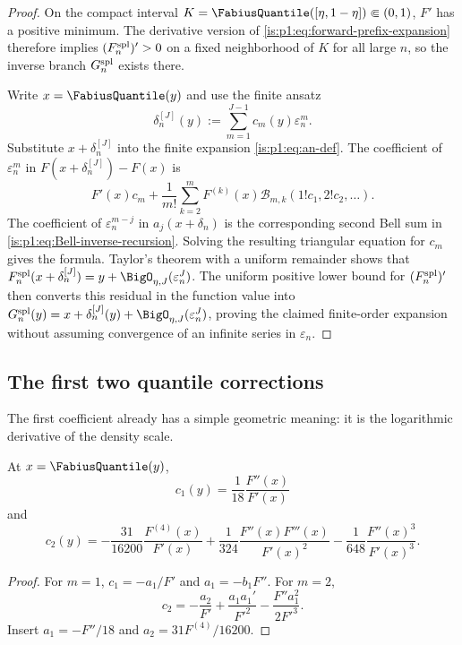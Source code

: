 \begin{proof}
On the compact interval $K=\FabiusQuantile([\eta,1-\eta])\Subset(0,1)$, $F'$ has a
positive minimum.  The derivative version of \eqref{is:p1:eq:forward-prefix-expansion}
therefore implies $(F_{n}^{\mathrm{spl}})'>0$ on a fixed neighborhood of $K$ for all large $n$,
so the inverse branch $G_{n}^{\mathrm{spl}}$ exists there.

Write $x=\FabiusQuantile(y)$ and use the finite ansatz
\[
 \delta_n^{[J]}(y):=\sum_{m=1}^{J-1}c_m(y)\varepsilon_n^m.
\]
Substitute $x+\delta_n^{[J]}$ into the finite expansion
\eqref{is:p1:eq:an-def}.  The coefficient of $\varepsilon_n^m$ in
$F(x+\delta_n^{[J]})-F(x)$ is
\[
 F'(x)c_m+\frac1{m!}\sum_{k=2}^{m}F^{(k)}(x)
 \mathcal B_{m,k}(1!c_1,2!c_2,\ldots).
\]
The coefficient of $\varepsilon_n^{m-j}$ in $a_j(x+\delta_n)$ is the corresponding
second Bell sum in \eqref{is:p1:eq:Bell-inverse-recursion}.  Solving the resulting
triangular equation for $c_m$ gives the formula.  Taylor's theorem with a
uniform remainder shows that
$\Fn(x+\delta_n^{[J]})=y+\BigO_{\eta,J}(\varepsilon_n^J)$.
The uniform positive lower bound for $(F_{n}^{\mathrm{spl}})'$ then converts this residual in
the function value into
$\Gn(y)=x+\delta_n^{[J]}(y)+\BigO_{\eta,J}(\varepsilon_n^J)$, proving the claimed
finite-order expansion without assuming convergence of an infinite series in
$\varepsilon_n$.
\end{proof}

\subsection{The first two quantile corrections}

The first coefficient already has a simple geometric meaning: it is the logarithmic
derivative of the density scale.

\begin{corollary}
\label{is:p1:cor:c1-c2}
At $x=\FabiusQuantile(y)$,
\begin{equation}
 \boxed{c_1(y)=\frac1{18}\frac{F''(x)}{F'(x)}}
 \label{is:p1:eq:c1}
\end{equation}
and
\begin{equation}
 \boxed{
 c_2(y)=
 -\frac{31}{16200}\frac{F^{(4)}(x)}{F'(x)}
 +\frac1{324}\frac{F''(x)F'''(x)}{F'(x)^2}
 -\frac1{648}\frac{F''(x)^3}{F'(x)^3}.}
 \label{is:p1:eq:c2}
\end{equation}
\end{corollary}

\begin{proof}
For $m=1$, $c_1=-a_1/F'$ and $a_1=-b_1F''$.  For $m=2$,
\[
 c_2=-\frac{a_2}{F'}+\frac{a_1a_1'}{F'^2}
 -\frac{F''a_1^2}{2F'^3}.
\]
Insert $a_1=-F''/18$ and $a_2=31F^{(4)}/16200$.
\end{proof}

